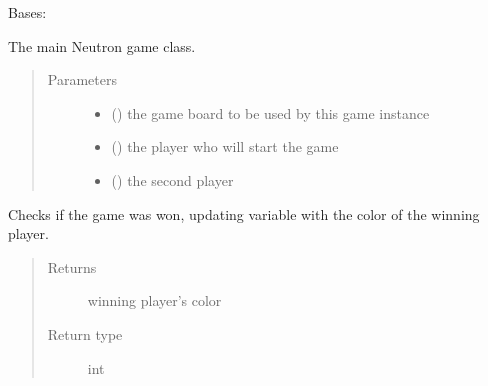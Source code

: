 \documentclass[letterpaper,10pt,english,openany,oneside]{sphinxmanual}
\begin{document}
\begin{fulllineitems}
\label{\detokenize{neutron:neutron.NeutronGame}}
Bases: 

The main Neutron game class.
\begin{quote}\begin{description}
\item[{Parameters}] \leavevmode\begin{itemize}
\item {} 
 ({\hyperref[\detokenize{neutron:neutron.NeutronBoard}]{}}) \textendash{} the game board to be used by this game instance

\item {} 
 ({\hyperref[\detokenize{player:player.Player}]{}}) \textendash{} the player who will start the game

\item {} 
 ({\hyperref[\detokenize{player:player.Player}]{}}) \textendash{} the second player

\end{itemize}

\end{description}\end{quote}

\begin{fulllineitems}
\label{\detokenize{neutron:neutron.NeutronGame.check_won}}
Checks if the game was won, updating  variable with the
color of the winning player.
\begin{quote}\begin{description}
\item[{Returns}] \leavevmode
winning player’s color

\item[{Return type}] \leavevmode
int


\end{description}
\end{quote}
\end{fulllineitems}
\end{fulllineitems}
\end{document}
